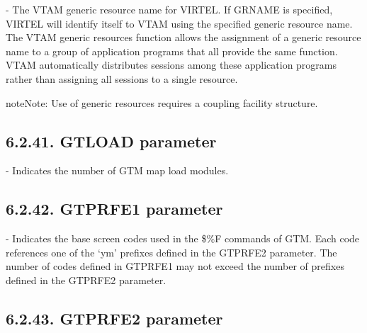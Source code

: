 \documentclass[letterpaper,10pt,english]{sphinxmanual}
\begin{document}
 - The VTAM generic resource name for VIRTEL. If GRNAME is specified, VIRTEL will identify itself to VTAM using the specified generic resource name. The VTAM generic resources function allows the assignment of a generic resource name to a group of application programs that all provide the same function. VTAM automatically distributes sessions among these application programs rather than assigning all sessions to a single resource.

\begin{sphinxadmonition}{note}{Note:}
Use of generic resources requires a coupling facility structure.
\end{sphinxadmonition}


\subsection{6.2.41. GTLOAD parameter}
\label{\detokenize{Installation_Guide:gtload-parameter}}
\begin{sphinxVerbatim}[commandchars=\\\{\}]
                
\end{sphinxVerbatim}

 - Indicates the number of GTM map load modules.


\subsection{6.2.42. GTPRFE1 parameter}
\label{\detokenize{Installation_Guide:gtprfe1-parameter}}
\begin{sphinxVerbatim}[commandchars=\\\{\}]
    
\end{sphinxVerbatim}

 - Indicates the base screen codes used in the \$\%F commands of GTM. Each code references one of the ‘ym’ prefixes defined in the GTPRFE2 parameter. The number of codes defined in GTPRFE1 may not exceed the number of prefixes defined in the GTPRFE2 parameter.


\subsection{6.2.43. GTPRFE2 parameter}
\label{\detokenize{Installation_Guide:gtprfe2-parameter}}
\begin{sphinxVerbatim}[commandchars=\\\{\}]
     
\end{sphinxVerbatim}
\end{document}
